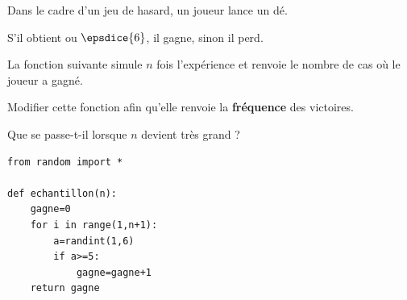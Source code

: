\begin{exo}{}
	Dans le cadre d'un jeu de hasard, un joueur lance un dé.

	S'il obtient  ou $\epsdice{6}$, il gagne, sinon il perd.

	La fonction suivante simule $n$ fois l'expérience et renvoie le nombre de cas où le joueur a gagné.

	Modifier cette fonction afin qu'elle renvoie la \textbf{fréquence} des victoires.

	Que se passe-t-il lorsque $n$ devient très grand ?
	{\footnotesize
	\begin{lstlisting}
from random import *

def echantillon(n):
    gagne=0
    for i in range(1,n+1):
        a=randint(1,6)
        if a>=5:
            gagne=gagne+1
    return gagne
\end{lstlisting}
	}
\end{exo}
